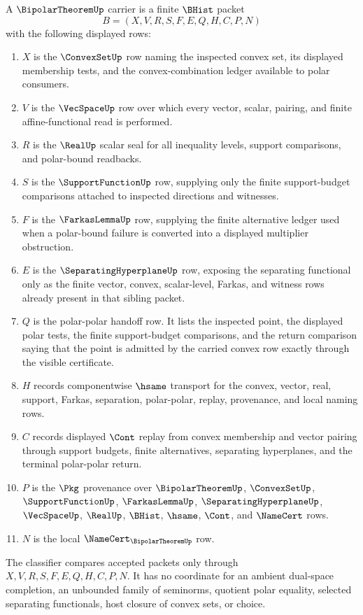 \begin{definition}
\label{def:bipolar-theorem-carrier}
A $\BipolarTheoremUp$ carrier is a finite $\BHist$ packet
$$
B=(X,V,R,S,F,E,Q,H,C,P,N)
$$
with the following displayed rows:
\begin{enumerate}
\item $X$ is the $\ConvexSetUp$ row naming the inspected convex set, its displayed membership tests, and the convex-combination ledger available to polar consumers.
\item $V$ is the $\VecSpaceUp$ row over which every vector, scalar, pairing, and finite affine-functional read is performed.
\item $R$ is the $\RealUp$ scalar seal for all inequality levels, support comparisons, and polar-bound readbacks.
\item $S$ is the $\SupportFunctionUp$ row, supplying only the finite support-budget comparisons attached to inspected directions and witnesses.
\item $F$ is the $\FarkasLemmaUp$ row, supplying the finite alternative ledger used when a polar-bound failure is converted into a displayed multiplier obstruction.
\item $E$ is the $\SeparatingHyperplaneUp$ row, exposing the separating functional only as the finite vector, convex, scalar-level, Farkas, and witness rows already present in that sibling packet.
\item $Q$ is the polar-polar handoff row. It lists the inspected point, the displayed polar tests, the finite support-budget comparisons, and the return comparison saying that the point is admitted by the carried convex row exactly through the visible certificate.
\item $H$ records componentwise $\hsame$ transport for the convex, vector, real, support, Farkas, separation, polar-polar, replay, provenance, and local naming rows.
\item $C$ records displayed $\Cont$ replay from convex membership and vector pairing through support budgets, finite alternatives, separating hyperplanes, and the terminal polar-polar return.
\item $P$ is the $\Pkg$ provenance over $\BipolarTheoremUp$, $\ConvexSetUp$, $\SupportFunctionUp$, $\FarkasLemmaUp$, $\SeparatingHyperplaneUp$, $\VecSpaceUp$, $\RealUp$, $\BHist$, $\hsame$, $\Cont$, and $\NameCert$ rows.
\item $N$ is the local $\NameCert_{\BipolarTheoremUp}$ row.
\end{enumerate}
The classifier compares accepted packets only through $X,V,R,S,F,E,Q,H,C,P,N$. It has no coordinate for an ambient dual-space completion, an unbounded family of seminorms, quotient polar equality, selected separating functionals, host closure of convex sets, or choice.
\end{definition}

